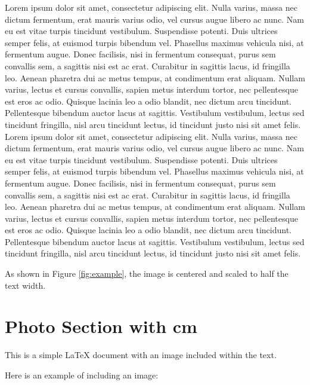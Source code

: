 \documentclass{article}  %
\begin{document}
\begin{justify}
Lorem ipsum dolor sit amet, consectetur adipiscing elit. Nulla varius, massa nec dictum fermentum, erat mauris varius odio, vel cursus augue libero ac nunc. Nam eu est vitae turpis tincidunt vestibulum. Suspendisse potenti. Duis ultrices semper felis, at euismod turpis bibendum vel. Phasellus maximus vehicula nisi, at fermentum augue. Donec facilisis, nisi in fermentum consequat, purus sem convallis sem, a sagittis nisi est ac erat. Curabitur in sagittis lacus, id fringilla leo. Aenean pharetra dui ac metus tempus, at condimentum erat aliquam. Nullam varius, lectus et cursus convallis, sapien metus interdum tortor, nec pellentesque est eros ac odio. Quisque lacinia leo a odio blandit, nec dictum arcu tincidunt. Pellentesque bibendum auctor lacus at sagittis. Vestibulum vestibulum, lectus sed tincidunt fringilla, nisl arcu tincidunt lectus, id tincidunt justo nisi sit amet felis.
Lorem ipsum dolor sit amet, consectetur adipiscing elit. Nulla varius, massa nec dictum fermentum, erat mauris varius odio, vel cursus augue libero ac nunc. Nam eu est vitae turpis tincidunt vestibulum. Suspendisse potenti. Duis ultrices semper felis, at euismod turpis bibendum vel. Phasellus maximus vehicula nisi, at fermentum augue. Donec facilisis, nisi in fermentum consequat, purus sem convallis sem, a sagittis nisi est ac erat. Curabitur in sagittis lacus, id fringilla leo. Aenean pharetra dui ac metus tempus, at condimentum erat aliquam. Nullam varius, lectus et cursus convallis, sapien metus interdum tortor, nec pellentesque est eros ac odio. Quisque lacinia leo a odio blandit, nec dictum arcu tincidunt. Pellentesque bibendum auctor lacus at sagittis. Vestibulum vestibulum, lectus sed tincidunt fringilla, nisl arcu tincidunt lectus, id tincidunt justo nisi sit amet felis.
\end{justify}

As shown in Figure \ref{fig:example}, the image is centered and scaled to half the text width.

\section{Photo Section with cm}
This is a simple LaTeX document with an image included within the text.

Here is an example of including an image:
\end{document}
